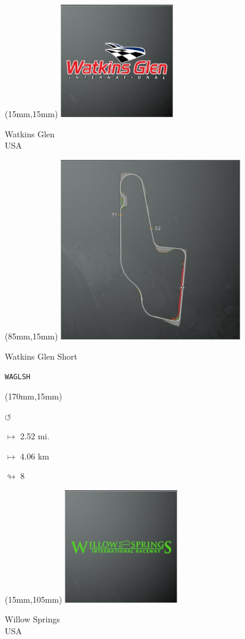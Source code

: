 \begin{textblock*}{60mm}(15mm,15mm)%
\includegraphics[width=50mm]{LG/2015-05-20_00097.png}
\par Watkins Glen\\ USA
\end{textblock*}
\begin{textblock*}{80mm}(85mm,15mm)%
\includegraphics[width=80mm]{TR/2015-05-20_00067.png}
\centerline{Watkins Glen Short}
\par\hfill\tiny\tt WAGLSH\\
\end{textblock*}
\begin{textblock*}{30mm}(170mm,15mm)%
\par \Huge$\circlearrowleft$
\Large
\par$\mapsto$ 2.52 mi.
\par$\mapsto$ 4.06 km
\par$\looparrowright$ 8
\end{textblock*}
\begin{textblock*}{60mm}(15mm,105mm)%
\includegraphics[width=50mm]{LG/2015-05-20_00098.png}
\par Willow Springs\\ USA
\end{textblock*}
